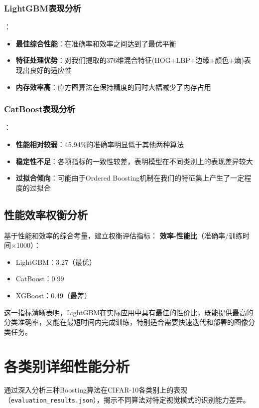 \documentclass[UTF8]{report}
\theoremstyle{MyLineTheoremStyle} %
\theoremstyle{MyBlockTheoremStyle} %
\theoremstyle{MySubsubsectionStyle} %
\begin{document}
\subsubsection{LightGBM表现分析}：
\begin{itemize}
    \item \textbf{最佳综合性能}：在准确率和效率之间达到了最优平衡
    \item \textbf{特征处理优势}：对我们提取的376维混合特征(HOG+LBP+边缘+颜色+熵)表现出良好的适应性
    \item \textbf{内存效率高}：直方图算法在保持精度的同时大幅减少了内存占用
\end{itemize}

\subsubsection{CatBoost表现分析}：
\begin{itemize}
    \item \textbf{性能相对较弱}：45.94\%的准确率明显低于其他两种算法
    \item \textbf{稳定性不足}：各项指标的一致性较差，表明模型在不同类别上的表现差异较大
    \item \textbf{过拟合倾向}：可能由于Ordered Boosting机制在我们的特征集上产生了一定程度的过拟合
\end{itemize}

\subsection{性能效率权衡分析}
基于性能和效率的综合考量，建立权衡评估指标：
\textbf{效率-性能比}（准确率/训练时间×1000）：
\begin{itemize}
    \item LightGBM：3.27（最优）
    \item CatBoost：0.99
    \item XGBoost：0.49（最差）
\end{itemize}
这一指标清晰表明，LightGBM在实际应用中具有最佳的性价比，既能提供最高的分类准确率，又能在最短时间内完成训练，特别适合需要快速迭代和部署的图像分类任务。

\section{各类别详细性能分析}
通过深入分析三种Boosting算法在CIFAR-10各类别上的表现（\texttt{evaluation\_results.json}），揭示不同算法对特定视觉模式的识别能力差异。
\end{document}
